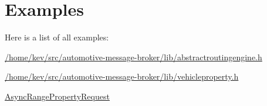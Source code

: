 \section{Examples}
Here is a list of all examples\-:\begin{DoxyCompactItemize}
\item 
\hyperlink{_2home_2kev_2src_2automotive-message-broker_2lib_2abstractroutingengine_8h-example}{/home/kev/src/automotive-\/message-\/broker/lib/abstractroutingengine.\-h}
\item 
\hyperlink{_2home_2kev_2src_2automotive-message-broker_2lib_2vehicleproperty_8h-example}{/home/kev/src/automotive-\/message-\/broker/lib/vehicleproperty.\-h}
\item 
\hyperlink{AsyncRangePropertyRequest-example}{Async\-Range\-Property\-Request}
\end{DoxyCompactItemize}
